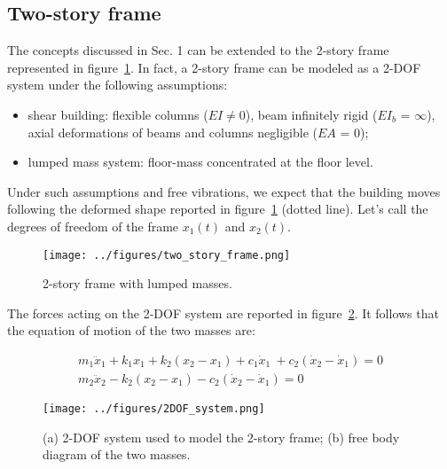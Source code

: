 \documentclass[12pt,letter]{article}
\begin{document}

\pagebreak

\subsection{Two-story frame}

The concepts discussed in Sec. 1 can be extended to the 2-story frame represented in figure~\ref{fig:two_story_frame}. In fact, a 2-story frame can be modeled as a 2-DOF system under the following assumptions:

\begin{itemize}
	\item shear building: flexible columns ($EI \neq 0$), beam infinitely rigid ($EI_b$ = $\infty$), axial deformations of beams and columns negligible ($EA$ = 0);
	\item lumped mass system: floor-mass concentrated at the floor level.
\end{itemize}

\noindent Under such assumptions and free vibrations, we expect that the building moves following the deformed shape reported in figure~\ref{fig:two_story_frame} (dotted line). Let's call the degrees of freedom of the frame $x_1(t)$ and $x_2(t)$. 

\begin{figure}[H]
	\centering
	\texttt{[image: ../figures/two\_story\_frame.png]}
	\caption{2-story frame with lumped masses.}
	\label{fig:two_story_frame}
\end{figure}


The forces acting on the 2-DOF system are reported in figure~\ref{fig:twodof}. It follows that the equation of motion of the two masses are:

\begin{eqnarray}
m_1\ddot{x}_1 +k_1 x_1 + k_2 (x_2 - x_1) + c_1 \dot{x}_1\ + c_2 (\dot{x}_2 - \dot{x}_1) = 0\\
m_2\ddot{x}_2 - k_2 (x_2 - x_1) - c_2 (\dot{x}_2 - \dot{x}_1) = 0 \nonumber
\end{eqnarray}

\begin{figure}[h]
	\centering
	\texttt{[image: ../figures/2DOF\_system.png]}
	\caption{(a) 2-DOF system used to model the 2-story frame; (b) free body diagram of the two masses.}
	\label{fig:twodof}
\end{figure}
\end{document}
